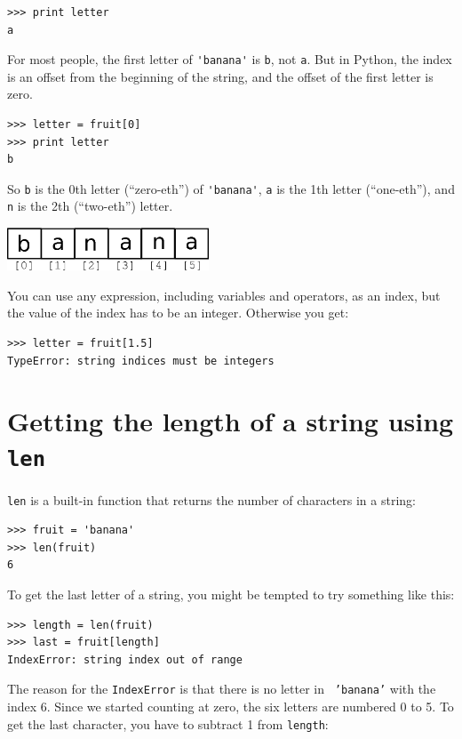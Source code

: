 \documentclass[10pt]{book}
\begin{document}
\beforeverb
\begin{verbatim}
>>> print letter
a
\end{verbatim}
\afterverb
%
For most people, the first letter of \verb"'banana'" is {\tt b}, not
{\tt a}.  But in Python, the index is an offset from the
beginning of the string, and the offset of the first letter is zero.

\beforeverb
\begin{verbatim}
>>> letter = fruit[0]
>>> print letter
b
\end{verbatim}
\afterverb
%
So {\tt b} is the 0th letter (``zero-eth'') of \verb"'banana'", {\tt a}
is the 1th letter (``one-eth''), and {\tt n} is the 2th (``two-eth'')
letter.

\beforefig
\centerline{\includegraphics[height=0.50in]{figs2/string.eps}}
\afterfig


You can use any expression, including variables and operators, as an
index, but the value of the index has to be an integer.  Otherwise you
get:


\beforeverb
\begin{verbatim}
>>> letter = fruit[1.5]
TypeError: string indices must be integers
\end{verbatim}
\afterverb
%

\section{Getting the length of a string using {\tt len}}


{\tt len} is a built-in function that returns the number of characters
in a string:

\beforeverb
\begin{verbatim}
>>> fruit = 'banana'
>>> len(fruit)
6
\end{verbatim}
\afterverb
%
To get the last letter of a string, you might be tempted to try something
like this:


\beforeverb
\begin{verbatim}
>>> length = len(fruit)
>>> last = fruit[length]
IndexError: string index out of range
\end{verbatim}
\afterverb
%
The reason for the {\tt IndexError} is that there is no letter in {\tt
'banana'} with the index 6.  Since we started counting at zero, the
six letters are numbered 0 to 5.  To get the last character, you have
to subtract 1 from {\tt length}:
\end{document}
